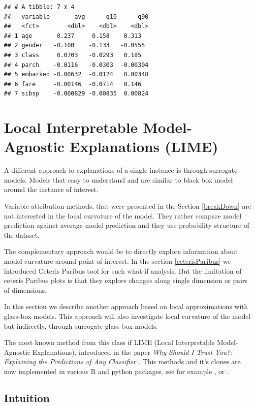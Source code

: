 \documentclass[12pt,]{krantz}
\theoremstyle{definition}
\theoremstyle{definition}
\theoremstyle{definition}
\theoremstyle{remark}
\begin{document}
\begin{verbatim}
## # A tibble: 7 x 4
##   variable       avg      q10      q90
##   <fct>        <dbl>    <dbl>    <dbl>
## 1 age       0.237     0.158    0.313  
## 2 gender   -0.100    -0.133   -0.0555 
## 3 class     0.0703   -0.0293   0.185  
## 4 parch    -0.0116   -0.0303  -0.00304
## 5 embarked -0.00632  -0.0124   0.00348
## 6 fare     -0.00146  -0.0714   0.146  
## 7 sibsp    -0.000829 -0.00835  0.00824
\end{verbatim}

\hypertarget{LIME}{%
\section{Local Interpretable Model-Agnostic Explanations
(LIME)}\label{LIME}}

A different approach to explanations of a single instance is through
surrogate models. Models that easy to understand and are similar to
black box model around the instance of interest.

Variable attribution methods, that were presented in the Section
\ref{breakDown} are not interested in the local curvature of the model.
They rather compare model prediction against average model prediction
and they use probability structure of the dataset.

The complementary approach would be to directly explore information
about model curvature around point of interest. In the section
\ref{ceterisParibus} we introduced Ceteris Paribus tool for such what-if
analysis. But the limitation of ceteris Paribus plots is that they
explore changes along single dimension or pairs of dimensions.

In this section we describe another approach based on local
approximations with glass-box models. This approach will also
investigate local curvature of the model but indirectly, through
surrogate glass-box models.

The most known method from this class if LIME (Local Interpretable
Model-Agnostic Explanations), introduced in the paper \emph{Why Should I
Trust You?: Explaining the Predictions of Any Classifier} \citep{lime}.
This methods and it's clones are now implemented in various R and python
packages, see for example \citep{R-lime}, \citep{R-live} or
\citep{R-iml}.

\hypertarget{intuition-3}{%
\subsection{Intuition}\label{intuition-3}}
\end{document}
